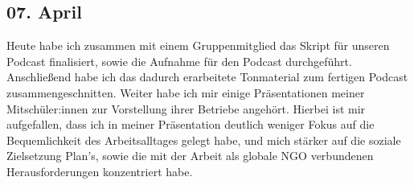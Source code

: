 \subsection{07. April}
Heute habe ich zusammen mit einem Gruppenmitglied das Skript für unseren Podcast finalisiert, sowie die Aufnahme für den Podcast durchgeführt. Anschließend habe ich das dadurch erarbeitete Tonmaterial zum fertigen Podcast zusammengeschnitten. Weiter habe ich mir einige Präsentationen meiner Mitschüler:innen zur Vorstellung ihrer Betriebe angehört. Hierbei ist mir aufgefallen, dass ich in meiner Präsentation deutlich weniger Fokus auf die Bequemlichkeit des Arbeitsalltages gelegt habe, und mich stärker auf die soziale Zielsetzung Plan's, sowie die mit der Arbeit als globale NGO verbundenen Herausforderungen konzentriert habe.